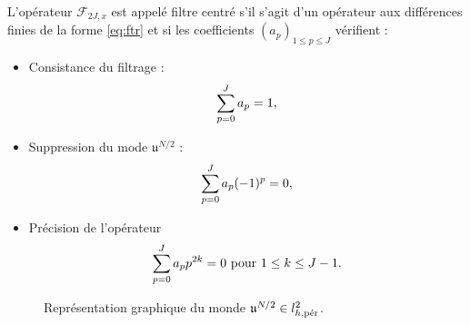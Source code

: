 \begin{definition}
L'opérateur $\mathcal{F}_{2J,x}$ est appelé filtre centré s'il s'agit d'un opérateur aux différences finies de la forme \eqref{eq:ftr} et si les coefficients $(a_p)_{1 \leq p \leq J}$ vérifient :
\begin{itemize}
\item Consistance du filtrage :
\begin{equation}
\gsum_{p=0}^J a_p = 1,
\label{eq:ftr_consistance}
\end{equation}
\item Suppression du mode $\mathfrak{u}^{N/2}$ :
\begin{equation}
\gsum_{p=0}^J a_p (-1)^p = 0,
\label{eq:ftr_filtrage}
\end{equation}
\item Précision de l'opérateur
\begin{equation}
\gsum_{p=0}^J a_p p^{2k} = 0 \text{ pour } 1 \leq k \leq J-1.
\label{eq:ftr_precision}
\end{equation}
\end{itemize}
\end{definition}

\begin{figure}[htbp]
\begin{center}
\end{center}
\caption{Représentation graphique du monde $\mathfrak{u}^{N/2} \in l^2_{h,\per}$.}
\label{fig:hf_waves}
\end{figure}

